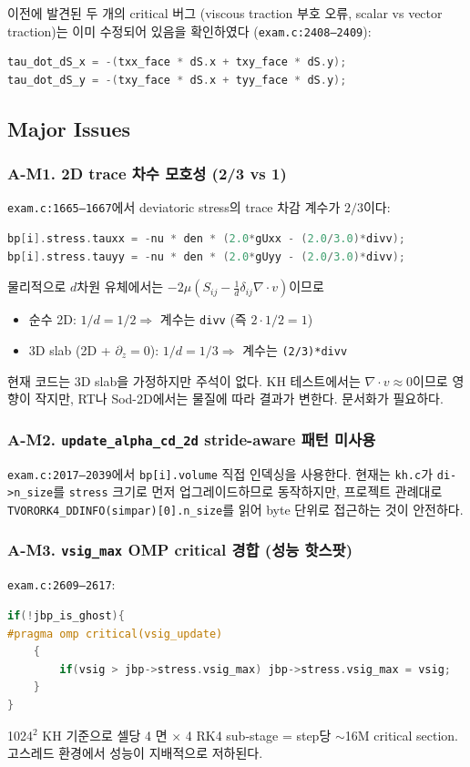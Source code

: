 \documentclass[11pt]{article}
\begin{document}
이전에 발견된 두 개의 critical 버그 (viscous traction 부호 오류, scalar vs vector traction)는
이미 수정되어 있음을 확인하였다 (\texttt{exam.c:2408--2409}):
\begin{lstlisting}[language=C]
tau_dot_dS_x = -(txx_face * dS.x + txy_face * dS.y);
tau_dot_dS_y = -(txy_face * dS.x + tyy_face * dS.y);
\end{lstlisting}

\subsection{Major Issues}

\subsubsection*{A-M1. 2D trace 차수 모호성 (2/3 vs 1)}
\texttt{exam.c:1665--1667}에서 deviatoric stress의 trace 차감 계수가 $2/3$이다:
\begin{lstlisting}[language=C]
bp[i].stress.tauxx = -nu * den * (2.0*gUxx - (2.0/3.0)*divv);
bp[i].stress.tauyy = -nu * den * (2.0*gUyy - (2.0/3.0)*divv);
\end{lstlisting}
물리적으로 $d$차원 유체에서는 $-2\mu(S_{ij} - \tfrac{1}{d}\delta_{ij}\nabla\cdot v)$이므로
\begin{itemize}
  \item 순수 2D: $1/d = 1/2 \Rightarrow$ 계수는 \texttt{divv} (즉 $2\cdot 1/2 = 1$)
  \item 3D slab (2D + $\partial_z=0$): $1/d = 1/3 \Rightarrow$ 계수는 \texttt{(2/3)*divv}
\end{itemize}
현재 코드는 3D slab을 가정하지만 주석이 없다. KH 테스트에서는 $\nabla\cdot v \approx 0$이므로
영향이 작지만, RT나 Sod-2D에서는 물질에 따라 결과가 변한다. 문서화가 필요하다.

\subsubsection*{A-M2. \texttt{update\_alpha\_cd\_2d} stride-aware 패턴 미사용}
\texttt{exam.c:2017--2039}에서 \texttt{bp[i].volume} 직접 인덱싱을 사용한다.
현재는 \texttt{kh.c}가 \texttt{di->n\_size}를 \texttt{stress} 크기로 먼저 업그레이드하므로
동작하지만, 프로젝트 관례대로 \texttt{TVORORK4\_DDINFO(simpar)[0].n\_size}를 읽어
byte 단위로 접근하는 것이 안전하다.

\subsubsection*{A-M3. \texttt{vsig\_max} OMP critical 경합 (성능 핫스팟)}
\texttt{exam.c:2609--2617}:
\begin{lstlisting}[language=C]
if(!jbp_is_ghost){
#pragma omp critical(vsig_update)
    {
        if(vsig > jbp->stress.vsig_max) jbp->stress.vsig_max = vsig;
    }
}
\end{lstlisting}
1024$^2$ KH 기준으로 셀당 4 면 $\times$ 4 RK4 sub-stage = step당 $\sim$16M critical section.
고스레드 환경에서 성능이 지배적으로 저하된다.
\end{document}
